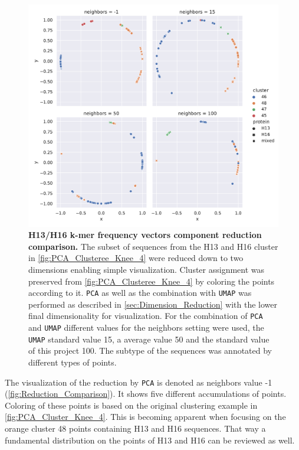 \begin{figure}[!hbt]
    \centering
    \includegraphics[width=\textwidth]{PCA/Difference_Segment_4_H_metric_cosine.pdf}
    \caption[H13/H16 k-mer frequency vectors component reduction comparison]{\textbf{H13/H16 k-mer frequency vectors component reduction comparison.} The subset of sequences from the H13 and H16 cluster in \autoref{fig:PCA_Clusteree_Knee_4} were reduced down to two dimensions enabling simple visualization. Cluster assignment was preserved from \autoref{fig:PCA_Clusteree_Knee_4} by coloring the points according to it. \texttt{PCA} as well as the combination with \texttt{UMAP} was performed as described in \autoref{sec:Dimension_Reduction} with the lower final dimensionality for visualization. For the combination of \texttt{PCA} and \texttt{UMAP} different values for the neighbors setting were used, the \texttt{UMAP} standard value 15, a average value 50 and the standard value of this project 100. The subtype of the sequences was annotated by different types of points.}
    \label{fig:Reduction_Comparison}
\end{figure}

The visualization of the reduction by \texttt{PCA} is denoted as neighbors value -1 (\autoref{fig:Reduction_Comparison}). It shows five different accumulations of points. Coloring of these points is based on the original clustering example in \autoref{fig:PCA_Cluster_Knee_4}. This is becoming apparent when focusing on the orange cluster 48 points containing H13 and H16 sequences. That way a fundamental distribution on the points of H13 and H16 can be reviewed as well. 
%

